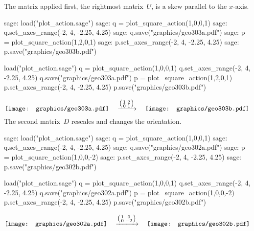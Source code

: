 The matrix applied first, the rightmost matrix~$U$, 
is a skew parallel to the $x$-axis.
\begin{sagecommandline}
sage: load("plot_action.sage")
sage: q = plot_square_action(1,0,0,1) 
sage: q.set_axes_range(-2, 4, -2.25, 4.25) 
sage: q.save("graphics/geo303a.pdf")
sage: p = plot_square_action(1,2,0,1) 
sage: p.set_axes_range(-2, 4, -2.25, 4.25) 
sage: p.save("graphics/geo303b.pdf")
\end{sagecommandline}
\begin{sagesilent}
load("plot_action.sage")
q = plot_square_action(1,0,0,1) 
q.set_axes_range(-2, 4, -2.25, 4.25) 
q.save("graphics/geo303a.pdf")
p = plot_square_action(1,2,0,1) 
p.set_axes_range(-2, 4, -2.25, 4.25) 
p.save("graphics/geo303b.pdf")
\end{sagesilent}
\begin{equation*}
  \vcenteredhbox{\texttt{[image: graphics/geo303a.pdf]}}
  \quad\mapsvia{\big (\begin{smallmatrix} 1 &2 \\ 0 &1 \end{smallmatrix}\big )}\quad
  \vcenteredhbox{\texttt{[image: graphics/geo303b.pdf]}}
\end{equation*}
The second matrix~$D$ rescales and changes the orientation.
\begin{sagecommandline}
sage: load("plot_action.sage")
sage: q = plot_square_action(1,0,0,1) 
sage: q.set_axes_range(-2, 4, -2.25, 4.25) 
sage: q.save("graphics/geo302a.pdf")
sage: p = plot_square_action(1,0,0,-2) 
sage: p.set_axes_range(-2, 4, -2.25, 4.25) 
sage: p.save("graphics/geo302b.pdf")
\end{sagecommandline}
\begin{sagesilent}
load("plot_action.sage")
q = plot_square_action(1,0,0,1) 
q.set_axes_range(-2, 4, -2.25, 4.25) 
q.save("graphics/geo302a.pdf")
p = plot_square_action(1,0,0,-2) 
p.set_axes_range(-2, 4, -2.25, 4.25) 
p.save("graphics/geo302b.pdf")
\end{sagesilent}
\begin{equation*}
  \vcenteredhbox{\texttt{[image: graphics/geo302a.pdf]}}
  \quad\mapsvia{\big (\begin{smallmatrix} 1 &0 \\ 0 &-2 \end{smallmatrix}\big )}\quad
  \vcenteredhbox{\texttt{[image: graphics/geo302b.pdf]}}
\end{equation*}

